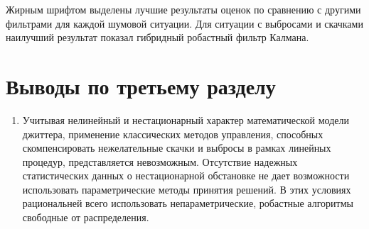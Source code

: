Жирным шрифтом выделены лучшие результаты оценок по сравнению с другими фильтрами для каждой шумовой ситуации. Для ситуации с выбросами и скачками наилучший результат показал гибридный робастный фильтр Калмана.








\section{Выводы по третьему разделу} \label{sect:concl3}

\begin{enumerate}

 
 \item Учитывая нелинейный и нестационарный характер математической модели джиттера, 
 применение классических методов управления, способных скомпенсировать нежелательные скачки и выбросы в рамках линейных процедур, представляется невозможным.
 Отсутствие надежных статистических данных о нестационарной обстановке не дает возможности использовать параметрические методы принятия решений.
 В этих условиях рациональней всего использовать непараметрические, робастные алгоритмы свободные от распределения.
 
 

\end{enumerate}
